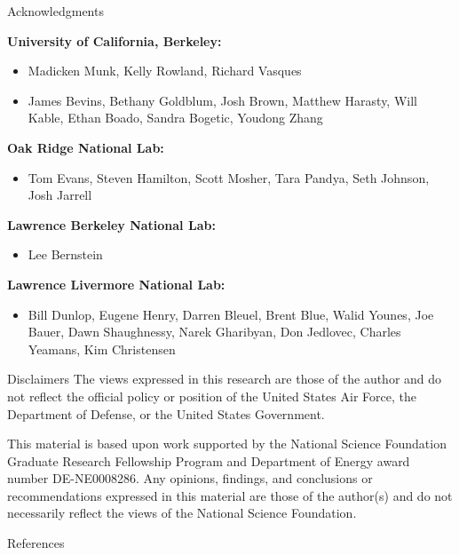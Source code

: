 \documentclass[xcolor=x11names,compress,handout]{beamer}
\renewcommand{\(}{\begin{columns}}
\renewcommand{\)}{\end{columns}}
\newcommand{\<}[1]{\begin{column}{#1}}
\renewcommand{\>}{\end{column}}
\begin{document}
\begin{frame}{Acknowledgments }
 	  \footnotesize{\textbf{University of California, Berkeley:}
	  \begin{itemize}
	    \item Madicken Munk, Kelly Rowland, Richard Vasques
	    \item James Bevins, Bethany Goldblum, Josh Brown, Matthew Harasty, Will Kable, Ethan Boado, Sandra Bogetic, Youdong Zhang
	  \end{itemize}
	  
	  \textbf{Oak Ridge National Lab:}
	    \begin{itemize}
	      \item Tom Evans, Steven Hamilton, Scott Mosher, Tara Pandya, Seth Johnson, Josh Jarrell
	    \end{itemize}
	    
	  \textbf{Lawrence Berkeley National Lab:}
	    \begin{itemize}
	      \item Lee Bernstein
	    \end{itemize}
	    
	  \textbf{Lawrence Livermore National Lab:}
	  \begin{itemize}
	    \item Bill Dunlop, Eugene Henry, Darren Bleuel, Brent Blue, Walid Younes, Joe Bauer, Dawn Shaughnessy, Narek Gharibyan, Don Jedlovec, Charles Yeamans, Kim Christensen 
	  \end{itemize}}
\end{frame}

\begin{frame}{Disclaimers}
\centering  
The views expressed in this research are those of the author and do not reflect the official policy or position of the United States Air Force, the Department of Defense, or the United States Government. \newline
\vspace{0.5cm}  

This material is based upon work supported by the National Science Foundation Graduate Research Fellowship Program and Department of Energy award number DE-NE0008286. Any opinions, findings, and conclusions or recommendations expressed in this material are those of the author(s) and do not necessarily reflect the views of the National Science Foundation.
\end{frame}


\begin{frame}{References}
\small
        
\end{frame}

%	
%	
\end{document}
